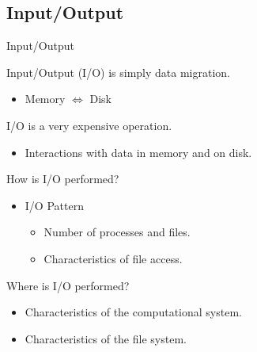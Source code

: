 \documentclass[compress,11pt,xcolor=svgnames,aspectratio=169]{beamer}
\begin{document}
\subsection{Input/Output}

\begin{frame}[t]{Input/Output}

Input/Output (I/O) is simply data migration.

\begin{itemize}
  \item Memory $\Leftrightarrow$ Disk
\end{itemize}

I/O is a very expensive operation.

\begin{itemize}
  \item Interactions with data in memory and on disk.
\end{itemize}

How is I/O performed?

\begin{itemize}

  \item I/O Pattern

  \begin{itemize}
    \item Number of processes and files.
    \item Characteristics of file access.
  \end{itemize}

\end{itemize}

Where is I/O performed?

\begin{itemize}
  \item Characteristics of the computational system.
  \item Characteristics of the file system.
\end{itemize}

\end{frame}
\end{document}
